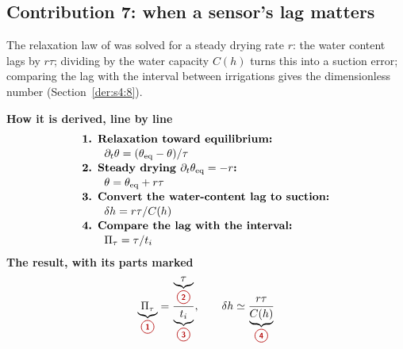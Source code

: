 \subsection{Contribution 7: when a sensor's lag matters}\label{con:s4:7}
\begin{derivation}
The relaxation law of \citet{RossSmettem2000} was solved for a steady drying rate $r$: the water content lags by $r\tau$; dividing by the water capacity $C(h)$ turns this into a suction error; comparing the lag with the interval between irrigations gives the dimensionless number (Section~\ref{der:s4:8}).
\end{derivation}
\begin{keyresult}
\begin{pencil}
{\small\noindent\textbf{How it is derived, line by line}
\[\begin{array}{@{}l@{}}\textbf{1. Relaxation toward equilibrium:}\\[1pt]
\qquad \partial_t\theta=(\theta_{\mathrm{eq}}-\theta)/\tau\\[1pt]
\textbf{2. Steady drying } \partial_t\theta_{\mathrm{eq}}=-r\textbf{:}\\[1pt]
\qquad \theta=\theta_{\mathrm{eq}}+r\tau\\[1pt]
\textbf{3. Convert the water-content lag to suction:}\\[1pt]
\qquad \delta h=r\tau/C(h)\\[1pt]
\textbf{4. Compare the lag with the interval:}\\[1pt]
\qquad \Pi_\tau=\tau/t_i
\end{array}\]}
\noindent\textbf{The result, with its parts marked}
\[\underbrace{\Pi_\tau}_{\circled{1}}=\frac{\underbrace{\tau}_{\circled{2}}}{\underbrace{t_i}_{\circled{3}}},\qquad \delta h\simeq\frac{r\tau}{\underbrace{C(h)}_{\circled{4}}}\]
\end{pencil}
\end{keyresult}
\begin{pins}
\end{pins}

